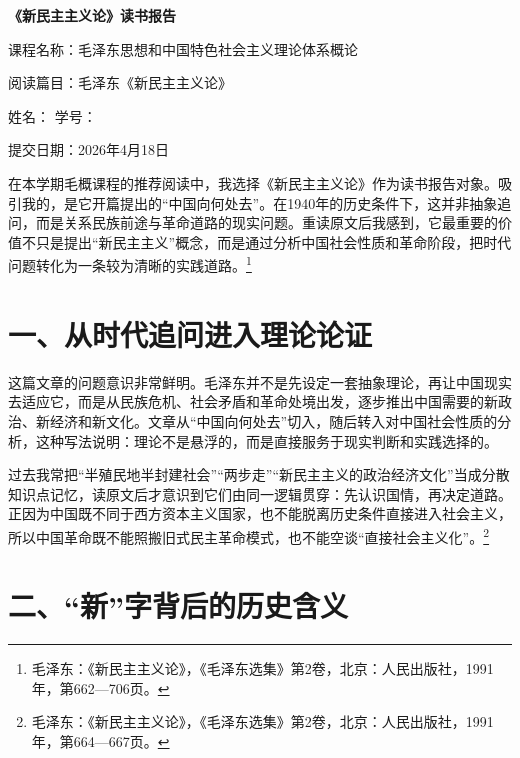 \documentclass[12pt,a4paper]{ctexart}
\begin{document}
\begin{center}
    {\bfseries 《新民主主义论》读书报告\par}
    \vspace{1.2em}
    {
    课程名称：毛泽东思想和中国特色社会主义理论体系概论\par}
    \vspace{0.4em}
    {
    阅读篇目：毛泽东《新民主主义论》\par}
    \vspace{0.4em}
    {
    姓名：\underline{\hspace{4.5cm}} \qquad
    学号：\underline{\hspace{4.5cm}}\par}
    \vspace{0.4em}
    {
    提交日期：2026年4月18日\par}
\end{center}

\vspace{1.5em}

在本学期毛概课程的推荐阅读中，我选择《新民主主义论》作为读书报告对象。吸引我的，是它开篇提出的“中国向何处去”。在1940年的历史条件下，这并非抽象追问，而是关系民族前途与革命道路的现实问题。重读原文后我感到，它最重要的价值不只是提出“新民主主义”概念，而是通过分析中国社会性质和革命阶段，把时代问题转化为一条较为清晰的实践道路。\footnote{毛泽东：《新民主主义论》，《毛泽东选集》第2卷，北京：人民出版社，1991年，第662—706页。}

\section*{一、从时代追问进入理论论证}

这篇文章的问题意识非常鲜明。毛泽东并不是先设定一套抽象理论，再让中国现实去适应它，而是从民族危机、社会矛盾和革命处境出发，逐步推出中国需要的新政治、新经济和新文化。文章从“中国向何处去”切入，随后转入对中国社会性质的分析，这种写法说明：理论不是悬浮的，而是直接服务于现实判断和实践选择的。

过去我常把“半殖民地半封建社会”“两步走”“新民主主义的政治经济文化”当成分散知识点记忆，读原文后才意识到它们由同一逻辑贯穿：先认识国情，再决定道路。正因为中国既不同于西方资本主义国家，也不能脱离历史条件直接进入社会主义，所以中国革命既不能照搬旧式民主革命模式，也不能空谈“直接社会主义化”。\footnote{毛泽东：《新民主主义论》，《毛泽东选集》第2卷，北京：人民出版社，1991年，第664—667页。}

\section*{二、“新”字背后的历史含义}
\end{document}

